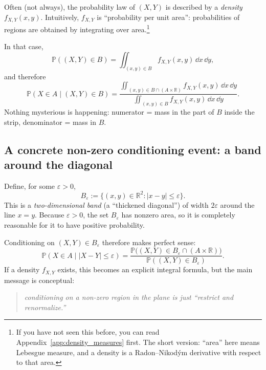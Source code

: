 \documentclass[11pt]{article}
\theoremstyle{remark}
\begin{document}
Often (not always), the probability law of \((X,Y)\) is described by a \emph{density}
\(f_{X,Y}(x,y)\). Intuitively, \(f_{X,Y}\) is ``probability per unit area'':
probabilities of regions are obtained by integrating over area.\footnote{
If you have not seen this before, you can read Appendix~\ref{app:density_measures} first.
The short version: ``area'' here means Lebesgue measure, and a density is a Radon--Nikod\'ym
derivative with respect to that area.}

In that case,
\[
\mathbb{P}((X,Y)\in B) = \iint_{(x,y)\in B} f_{X,Y}(x,y)\,\dd x\,\dd y,
\]
and therefore
\[
\mathbb{P}(X\in A \mid (X,Y)\in B)
=
\frac{\iint_{(x,y)\in B\cap(A\times\mathbb{R})} f_{X,Y}(x,y)\,\dd x\,\dd y}
{\iint_{(x,y)\in B} f_{X,Y}(x,y)\,\dd x\,\dd y}.
\]
Nothing mysterious is happening: numerator = mass in the part of \(B\) inside the strip,
denominator = mass in \(B\).

\subsection{A concrete non-zero conditioning event: a band around the diagonal}

Define, for some \(\varepsilon>0\),
\[
B_\varepsilon := \{(x,y)\in\mathbb{R}^2 : |x-y|\le \varepsilon\}.
\]
This is a \emph{two-dimensional band} (a ``thickened diagonal'') of width \(2\varepsilon\)
around the line \(x=y\). Because \(\varepsilon>0\), the set \(B_\varepsilon\) has nonzero area,
so it is completely reasonable for it to have positive probability.

Conditioning on \((X,Y)\in B_\varepsilon\) therefore makes perfect sense:
\[
\mathbb{P}(X\in A \mid |X-Y|\le \varepsilon)
=
\frac{\mathbb{P}\big((X,Y)\in B_\varepsilon \cap (A\times\mathbb{R})\big)}
{\mathbb{P}((X,Y)\in B_\varepsilon)}.
\]
If a density \(f_{X,Y}\) exists, this becomes an explicit integral formula, but the main message
is conceptual:
\begin{quote}
\emph{conditioning on a non-zero region in the plane is just ``restrict and renormalize.''}
\end{quote}
\end{document}
